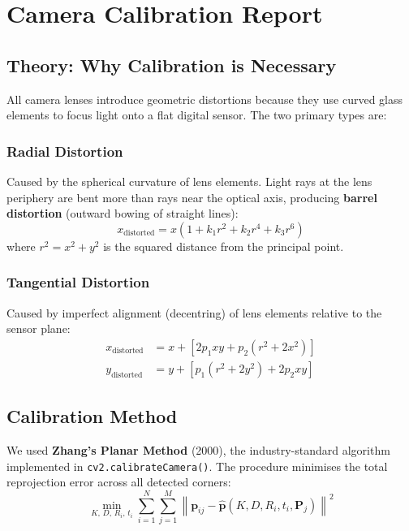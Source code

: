\documentclass[12pt, a4paper, twoside]{report}
\begin{document}
\chapter{Camera Calibration Report}
\label{ch:calibration}

\section{Theory: Why Calibration is Necessary}
All camera lenses introduce geometric distortions because they use curved glass elements to focus light onto a flat digital sensor. The two primary types are:

\subsection{Radial Distortion}
Caused by the spherical curvature of lens elements. Light rays at the lens periphery are bent more than rays near the optical axis, producing \textbf{barrel distortion} (outward bowing of straight lines):
\begin{equation}
\label{eq:radial}
x_{\text{distorted}} = x\left(1 + k_1 r^2 + k_2 r^4 + k_3 r^6\right)
\end{equation}
where $r^2 = x^2 + y^2$ is the squared distance from the principal point.

\subsection{Tangential Distortion}
Caused by imperfect alignment (decentring) of lens elements relative to the sensor plane:
\begin{equation}
\label{eq:tangential}
\begin{aligned}
x_{\text{distorted}} &= x + \left[2p_1 xy + p_2\left(r^2 + 2x^2\right)\right] \\
y_{\text{distorted}} &= y + \left[p_1\left(r^2 + 2y^2\right) + 2p_2 xy\right]
\end{aligned}
\end{equation}

\section{Calibration Method}
We used \textbf{Zhang's Planar Method} (2000), the industry-standard algorithm implemented in \texttt{cv2.calibrateCamera()}. The procedure minimises the total reprojection error across all detected corners:
\begin{equation}
\label{eq:reprojection-opt}
\min_{K,\, D,\, R_i,\, t_i} \sum_{i=1}^{N} \sum_{j=1}^{M} \left\| \mathbf{p}_{ij} - \hat{\mathbf{p}}\left(K, D, R_i, t_i, \mathbf{P}_j\right) \right\|^2
\end{equation}
\end{document}
